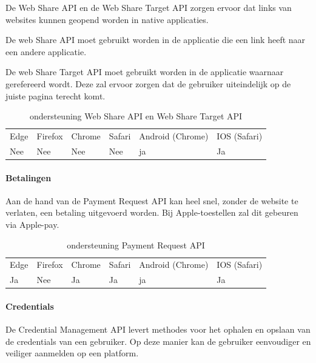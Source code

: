 De Web Share API \autocite{Giuca2020} en de Web Share Target API \autocite{Williger2020} zorgen ervoor dat links van websites kunnen geopend worden in native applicaties. 

De web Share API moet gebruikt worden in de applicatie die een link heeft naar een andere applicatie.

De web Share Target API moet gebruikt worden in de applicatie waarnaar gerefereerd wordt. Deze zal ervoor zorgen dat de gebruiker uiteindelijk op de juiste pagina terecht komt.

\begin{table}[H]
	\centering
	\begin{tabular}{llllll}
		Edge & Firefox & Chrome & Safari & Android (Chrome) & IOS (Safari) \\
		Nee   & Nee      &  Nee     & Nee     & ja               & Ja          
	\end{tabular}	
	\caption{ondersteuning Web Share API en Web Share Target API}
	\label{ondersteuning Web Share API en Web Share Target API}
\end{table}



\paragraph{Betalingen}
Aan de hand van de Payment Request API \autocite{Denicola2020} kan heel snel, zonder de website te verlaten, een betaling uitgevoerd worden. Bij Apple-toestellen zal dit gebeuren via Apple-pay. 

\begin{table}[H]
	\centering
	\begin{tabular}{llllll}
		Edge & Firefox & Chrome & Safari & Android (Chrome) & IOS (Safari) \\
		Ja   & Nee      &  Ja     & Ja     & ja               & Ja          
	\end{tabular}	
	\caption{ondersteuning Payment Request API}
	\label{ondersteuning Payment Request API}
\end{table}


\paragraph{Credentials}
De Credential Management API \autocite{West2020} levert methodes voor het ophalen en opslaan van de credentials van een gebruiker. Op deze manier kan de gebruiker eenvoudiger en veiliger aanmelden op een platform.

